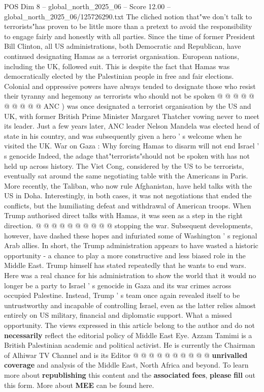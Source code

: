 \begin{textsample}{POS Dim 8 – global\_north\_2025\_06 – Score 12.00 – global\_north\_2025\_06/125726290.txt}
The cliched notion that"we don't talk to terrorists"has proven to be little more than a pretext to avoid the responsibility to engage fairly and honestly with all parties.
Since the time of former President Bill Clinton, all US administrations, both Democratic and Republican, have continued designating Hamas as a terrorist organisation.
European nations, including the UK, followed suit.
This is despite the fact that Hamas was democratically elected by the Palestinian people in free and fair elections.
Colonial and oppressive powers have always tended to designate those who resist their tyranny and hegemony as terrorists who should not be spoken @ @ @ @ @ @ @ @ @ @ ANC ) was once designated a terrorist organisation by the US and UK, with former British Prime Minister Margaret Thatcher vowing never to meet its leader.
Just a few years later, ANC leader Nelson Mandela was elected head of state in his country, and was subsequently given a hero ' s welcome when he visited the UK.
War on Gaza : Why forcing Hamas to disarm will not end Israel ' s genocide Indeed, the adage that"terrorists"should not be spoken with has not held up across history.
The Viet Cong, considered by the US to be terrorists, eventually sat around the same negotiating table with the Americans in Paris.
More recently, the Taliban, who now rule Afghanistan, have held talks with the US in Doha.
Interestingly, in both cases, it was not negotiations that ended the conflicts, but the humiliating defeat and withdrawal of American troops.
When Trump authorised direct talks with Hamas, it was seen as a step in the right direction. @ @ @ @ @ @ @ @ @ @ stopping the war.
Subsequent developments, however, have dashed these hopes and infuriated some of Washington ' s regional Arab allies.
In short, the Trump administration appears to have wasted a historic opportunity - a chance to play a more constructive and less biased role in the Middle East.
Trump himself has stated repeatedly that he wants to end wars.
Here was a real chance for his administration to show the world that it would no longer be a party to Israel ' s genocide in Gaza and its war crimes across occupied Palestine.
Instead, Trump ' s team once again revealed itself to be untrustworthy and incapable of controlling Israel, even as the latter relies almost entirely on US military, financial and diplomatic support.
What a missed opportunity.
The views expressed in this article belong to the author and do not \textbf{necessarily} reflect the editorial policy of Middle East Eye.
Azzam Tamimi is a British Palestinian academic and political activist.
He is currently the Chairman of Alhiwar TV Channel and is its Editor @ @ @ @ @ @ @ @ @ @ \textbf{unrivalled} \textbf{coverage} and analysis of the Middle East, North Africa and beyond.
To learn more about \textbf{republishing} this content and the \textbf{associated} \textbf{fees}, \textbf{please} \textbf{fill} out this form.
More about \textbf{MEE} can be found here.

\end{textsample}
